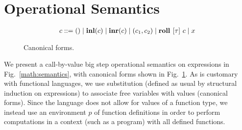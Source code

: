 \section{Operational Semantics}\label{sec:semantics}

\begin{figure}[t]
\begin{align*}
  c ::= () \mid \textbf{inl}(c) \mid \textbf{inr}(c) \mid (c_1, c_2) \mid \textbf{roll } [\tau]\ c \mid x
\end{align*}
\caption{Canonical forms.}\label{fig:canonical}
\end{figure}

We present a call-by-value big step operational semantics on expressions in
Fig.~\ref{math:semantics}, with canonical forms shown in
Fig.~\ref{fig:canonical}. As is customary with functional languages, we use
substitution (defined as usual by structural induction on expressions) to
associate free variables with values (canonical forms). Since the language does
not allow for values of a function type, we instead use an environment $p$ of
function definitions in order to perform computations in a context (such as a
program) with all defined functions.

